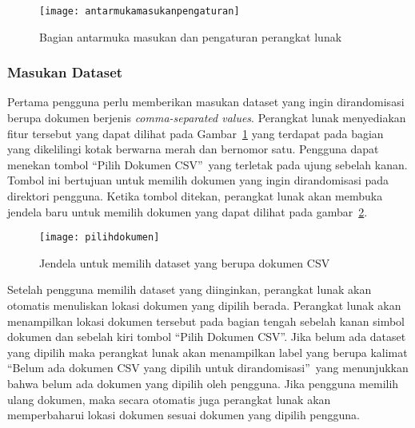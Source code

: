 \begin{figure}
	\centering
	\texttt{[image: antarmukamasukanpengaturan]}
	\caption{Bagian antarmuka masukan dan pengaturan perangkat lunak}
	\label{fig:antarmukamasukanpengaturan}
\end{figure}

\subsubsection{Masukan Dataset}
\label{sec:masukandataset}

Pertama pengguna perlu memberikan masukan dataset yang ingin dirandomisasi berupa dokumen berjenis \textit{comma-separated values}. Perangkat lunak menyediakan fitur tersebut yang dapat dilihat pada Gambar~\ref{fig:antarmukamasukanpengaturan} yang terdapat pada bagian yang dikelilingi kotak berwarna merah dan bernomor satu. Pengguna dapat menekan tombol \textquotedblleft Pilih Dokumen CSV\textquotedblright~yang terletak pada ujung sebelah kanan. Tombol ini bertujuan untuk memilih dokumen yang ingin dirandomisasi pada direktori pengguna. Ketika tombol ditekan, perangkat lunak akan membuka jendela baru untuk memilih dokumen yang dapat dilihat pada gambar~\ref{fig:pilihdokumen}.

\begin{figure}
	\centering
	\texttt{[image: pilihdokumen]}
	\caption{Jendela untuk memilih dataset yang berupa dokumen CSV}
	\label{fig:pilihdokumen}
\end{figure}

Setelah pengguna memilih dataset yang diinginkan, perangkat lunak akan otomatis menuliskan lokasi dokumen yang dipilih berada. Perangkat lunak akan menampilkan lokasi dokumen tersebut pada bagian tengah sebelah kanan simbol dokumen dan sebelah kiri tombol \textquotedblleft Pilih Dokumen CSV\textquotedblright. Jika belum ada dataset yang dipilih maka perangkat lunak akan menampilkan label yang berupa kalimat \textquotedblleft Belum ada dokumen CSV yang dipilih untuk dirandomisasi\textquotedblright~yang menunjukkan bahwa belum ada dokumen yang dipilih oleh pengguna. Jika pengguna memilih ulang dokumen, maka secara otomatis juga perangkat lunak akan memperbaharui lokasi dokumen sesuai dokumen yang dipilih pengguna.

